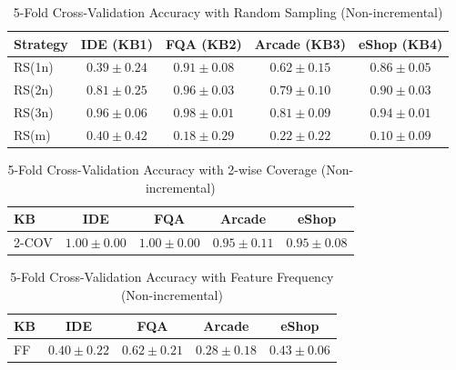 \begin{table}[htbp]
\centering
\caption{5-Fold Cross-Validation Accuracy with Random Sampling (Non-incremental)}
\label{tab:table9}
\begin{tabular}{lcccc}
\toprule
Strategy & IDE (KB1) & FQA (KB2) & Arcade (KB3) & eShop (KB4) \\
\midrule
RS(1n) & $0.39 \pm 0.24$ & $0.91 \pm 0.08$ & $0.62 \pm 0.15$ & $0.86 \pm 0.05$ \\
RS(2n) & $0.81 \pm 0.25$ & $0.96 \pm 0.03$ & $0.79 \pm 0.10$ & $0.90 \pm 0.03$ \\
RS(3n) & $0.96 \pm 0.06$ & $0.98 \pm 0.01$ & $0.81 \pm 0.09$ & $0.94 \pm 0.01$ \\
RS(m)  & $0.40 \pm 0.42$ & $0.18 \pm 0.29$ & $0.22 \pm 0.22$ & $0.10 \pm 0.09$ \\
\bottomrule
\end{tabular}
\end{table}


\begin{table}[htbp]
\centering
\caption{5-Fold Cross-Validation Accuracy with 2-wise Coverage (Non-incremental)}
\label{tab:table10}
\begin{tabular}{lcccc}
\toprule
KB & IDE & FQA & Arcade & eShop \\
\midrule
2-COV & $1.00 \pm 0.00$ & $1.00 \pm 0.00$ & $0.95 \pm 0.11$ & $0.95 \pm 0.08$ \\
\bottomrule
\end{tabular}
\end{table}


\begin{table}[htbp]
\centering
\caption{5-Fold Cross-Validation Accuracy with Feature Frequency (Non-incremental)}
\label{tab:table11}
\begin{tabular}{lcccc}
\toprule
KB & IDE & FQA & Arcade & eShop \\
\midrule
FF & $0.40 \pm 0.22$ & $0.62 \pm 0.21$ & $0.28 \pm 0.18$ & $0.43 \pm 0.06$ \\
\bottomrule
\end{tabular}
\end{table}

